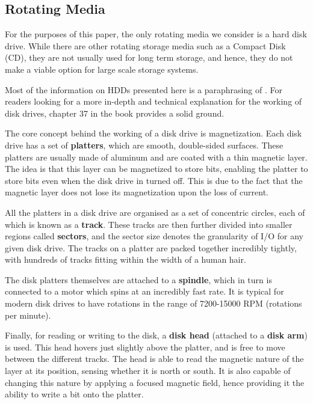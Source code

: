 \documentclass[10pt, author, twocolumn]{article}
\begin{document}
\subsection{Rotating Media}

For the purposes of this paper, the only rotating media we consider is a hard disk drive. While there are other rotating storage media such as a Compact Disk (CD), they are not usually used for long term storage, and hence, they do not make a viable option for large scale storage systems.

Most of the information on HDDs presented here is a paraphrasing of \cite{osbook}. For readers looking for a more in-depth and technical explanation for the working of disk drives, chapter 37 in the book provides a solid ground. 

The core concept behind the working of a disk drive is magnetization. Each disk drive has a set of \textbf{platters}, which are smooth, double-sided surfaces. These platters are usually made of aluminum and are coated with a thin magnetic layer. The idea is that this layer can be magnetized to store bits, enabling the platter to store bits even when the disk drive in turned off. This is due to the fact that the magnetic layer does not lose its magnetization upon the loss of current. 

All the platters in a disk drive are organised as a set of concentric circles, each of which is known as a \textbf{track}. These tracks are then further divided into smaller regions called \textbf{sectors}, and the sector size denotes the granularity of I/O for any given disk drive. The tracks on a platter are packed together incredibly tightly, with hundreds of tracks fitting within the width of a human hair.

The disk platters themselves are attached to a \textbf{spindle}, which in turn is connected to a motor which spins at an incredibly fast rate. It is typical for modern disk drives to have rotations in the range of 7200-15000 RPM (rotations per minute). 

Finally, for reading or writing to the disk, a \textbf{disk head} (attached to a \textbf{disk arm}) is used. This head hovers just slightly above the platter, and is free to move between the different tracks. The head is able to read the magnetic nature of the layer at its position, sensing whether it is north or south. It is also capable of changing this nature by applying a focused magnetic field, hence providing it the ability to write a bit onto the platter.
\end{document}
